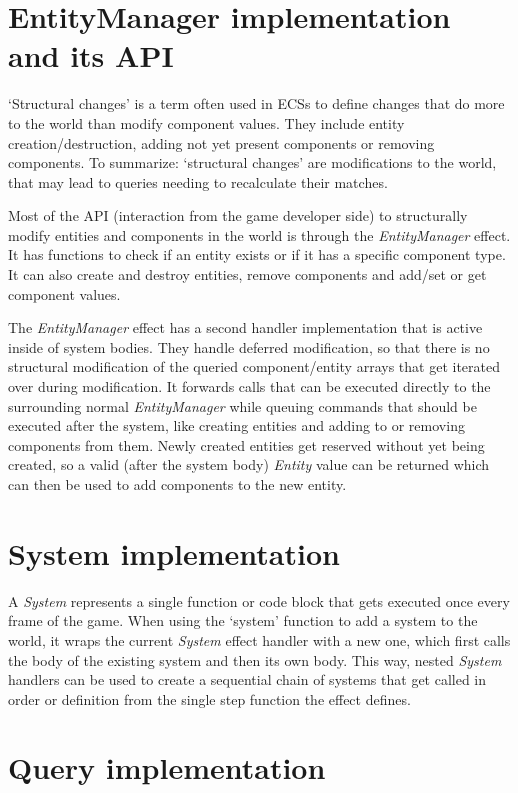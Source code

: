 \section{EntityManager implementation and its API}

`Structural changes' is a term often used in ECSs to define changes that do more to the world than modify component values. They include entity creation/destruction, adding not yet present components or removing components. To summarize: `structural changes' are modifications to the world, that may lead to queries needing to recalculate their matches.

Most of the API (interaction from the game developer side) to structurally modify entities and components in the world is through the \textit{EntityManager} effect. It has functions to check if an entity exists or if it has a specific component type. It can also create and destroy entities, remove components and add/set or get component values.

The \textit{EntityManager} effect has a second handler implementation that is active inside of system bodies. They handle deferred modification, so that there is no structural modification of the queried component/entity arrays that get iterated over during modification. It forwards calls that can be executed directly to the surrounding normal \textit{EntityManager} while queuing commands that should be executed after the system, like creating entities and adding to or removing components from them. Newly created entities get reserved without yet being created, so a valid (after the system body) \textit{Entity} value can be returned which can then be used to add components to the new entity.

\section{System implementation}

A \textit{System} represents a single function or code block that gets executed once every frame of the game. When using the `system' function to add a system to the world, it wraps the current \textit{System} effect handler with a new one, which first calls the body of the existing system and then its own body. This way, nested \textit{System} handlers can be used to create a sequential chain of systems that get called in order or definition from the single step function the effect defines.

\section{Query implementation}


